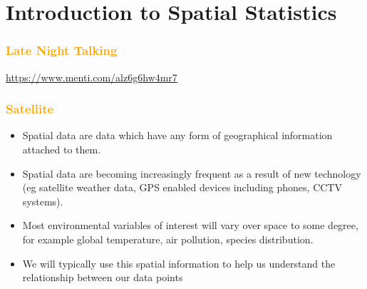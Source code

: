 \documentclass[parskip,12pt]{beamer}
\begin{document}
\section{Introduction to Spatial Statistics}

\begin{frame}
\frametitle{\textcolor{orange}{Late Night Talking}}
\vspace{-3mm}
\url{https://www.menti.com/alz6g6hw4mr7}
\end{frame}

\begin{frame}
\frametitle{\textcolor{orange}{Satellite}}
\begin{itemize}
\item Spatial data are data which have any form of geographical information attached to them.
\vspace{3mm}
\item Spatial data are becoming increasingly frequent as a result of new technology (eg satellite weather data, GPS enabled devices including phones, CCTV systems).
\vspace{3mm}
\item Most environmental variables of interest will vary over space to some degree, for example global temperature, air pollution, species distribution.
\vspace{3mm}
\item We will typically use this spatial information to help us understand the relationship between our data points
\end{itemize}
\end{frame}
\end{document}
